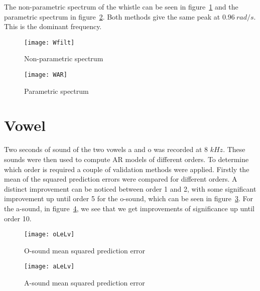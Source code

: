 \documentclass[10pt]{article}
\begin{document}
The non-parametric spectrum of the whistle can be seen in figure~\ref{fig:Wfilt}
and the parametric spectrum in figure~\ref{fig:WAR}. Both methods give the same peak
at $0.96~rad/s$. This is the dominant frequency.


\begin{figure}[!hp]

    \begin{center}
      \texttt{[image: Wfilt]}
    \caption{Non-parametric spectrum \label{fig:Wfilt}}
    \end{center}

\end{figure}

\begin{figure}[!hp]

    \begin{center}
      \texttt{[image: WAR]}
    \caption{Parametric spectrum \label{fig:WAR}}
    \end{center}

\end{figure}


\section{Vowel}
Two seconds of sound of the two vowels a and o was recorded at
8 $kHz$. These sounds were then used to compute AR models of
different orders. To determine which order is required a couple of validation
methods were applied. Firstly the mean of the squared prediction errors were compared for different
orders. A distinct improvement can be noticed between order 1 and 2, with some
significant improvement up until order 5 for the o-sound, which can be seen in
figure~\ref{fig:oLeLv}. For the a-sound, in figure~\ref{fig:aLeLv}, we see that
 we get improvements of significance up until order 10.


\begin{figure}[!hp]

    \begin{center}
      \texttt{[image: oLeLv]}
    \caption{O-sound mean squared prediction error \label{fig:oLeLv}}
    \end{center}

\end{figure}

\begin{figure}[!hp]

    \begin{center}
      \texttt{[image: aLeLv]}
    \caption{A-sound mean squared prediction error \label{fig:aLeLv}}
    \end{center}

\end{figure}
\end{document}
